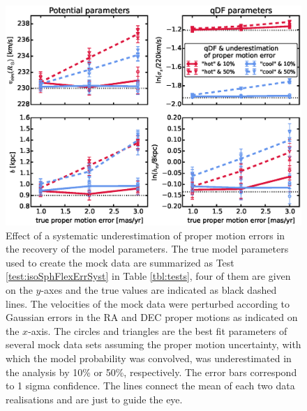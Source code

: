 \begin{figure}[!htbp]
\centering
\includegraphics[width=\columnwidth]{figs/isoSphFlexErrSyst_offset_vs_error.eps}
\caption{Effect of a systematic underestimation of proper motion errors in the recovery of the model parameters. The true model parameters used to create the mock data are summarized as Test \ref{test:isoSphFlexErrSyst} in Table \ref{tbl:tests}, four of them are given on the $y$-axes and the true values are indicated as black dashed lines. The velocities of the mock data were perturbed according to Gaussian errors in the RA and DEC proper motions as indicated on the $x$-axis. The circles and triangles are the best fit parameters of several mock data sets assuming the proper motion uncertainty, with which the model probability was convolved, was underestimated in the analysis by 10\% or 50\%, respectively. The error bars correspond to 1 sigma confidence. The lines connect the mean of each two data realisations and are just to guide the eye. }
\label{fig:isoSphFlexErrSyst}
\end{figure}


